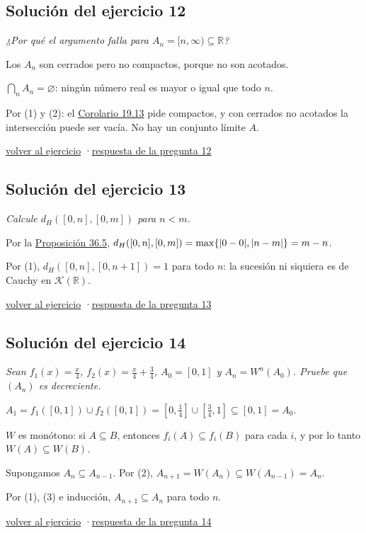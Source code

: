 \documentclass[11pt,a4paper]{article}
\newcommand{\R}{\mathbb{R}}\newcommand{\N}{\mathbb{N}}\newcommand{\Q}{\mathbb{Q}}
\providecommand{\lt}{<}\providecommand{\gt}{>}
\begin{document}
\subsection*{\hypertarget{s-12}{}Solución del ejercicio 12}
\emph{¿Por qué el argumento falla para $A_n=[n,\infty)\subseteq\R$?}
\begin{pasos}
\item[(1)] Los $A_n$ son cerrados pero no compactos, porque no son acotados.
\item[(2)] $\bigcap_nA_n=\varnothing$: ningún número real es mayor o igual que todo $n$.
\item[] Por (1) y (2): el \href{https://decostruttivismo.github.io/MAT2514-repaso/pdf/MAT2514_apuntes_completos.pdf\#nameddest=teorema.19.13}{Corolario 19.13} pide compactos, y con cerrados no acotados la intersección puede ser vacía. No hay un conjunto límite $A$.
\end{pasos}
\par{\small \hyperlink{x-12}{volver al ejercicio} \quad·\quad \hyperlink{r-12}{respuesta de la pregunta 12}}
\subsection*{\hypertarget{s-13}{}Solución del ejercicio 13}
\emph{Calcule $d_H([0,n],[0,m])$ para $n\lt m$.}
\begin{pasos}
\item[(1)] Por la \href{https://decostruttivismo.github.io/MAT2514-repaso/pdf/MAT2514_apuntes_completos.pdf\#nameddest=teorema.36.5}{Proposición 36.5}, $d_H([0,n],[0,m])=\max\{\lvert 0-0\rvert,\lvert n-m\rvert\}=m-n$.
\item[] Por (1), $d_H([0,n],[0,n+1])=1$ para todo $n$: la sucesión ni siquiera es de Cauchy en $\mathcal K(\R)$.
\end{pasos}
\par{\small \hyperlink{x-13}{volver al ejercicio} \quad·\quad \hyperlink{r-13}{respuesta de la pregunta 13}}
\subsection*{\hypertarget{s-14}{}Solución del ejercicio 14}
\emph{Sean $f_1(x)=\frac x4$, $f_2(x)=\frac x4+\frac34$, $A_0=[0,1]$ y $A_n=W^n(A_0)$. Pruebe que $(A_n)$ es decreciente.}
\begin{pasos}
\item[(1)] $A_1=f_1([0,1])\cup f_2([0,1])=[0,\frac14]\cup[\frac34,1]\subseteq[0,1]=A_0$.
\item[(2)] $W$ es monótono: si $A\subseteq B$, entonces $f_i(A)\subseteq f_i(B)$ para cada $i$, y por lo tanto $W(A)\subseteq W(B)$.
\item[(3)] Supongamos $A_n\subseteq A_{n-1}$. Por (2), $A_{n+1}=W(A_n)\subseteq W(A_{n-1})=A_n$.
\item[] Por (1), (3) e inducción, $A_{n+1}\subseteq A_n$ para todo $n$.
\end{pasos}
\par{\small \hyperlink{x-14}{volver al ejercicio} \quad·\quad \hyperlink{r-14}{respuesta de la pregunta 14}}
\end{document}
